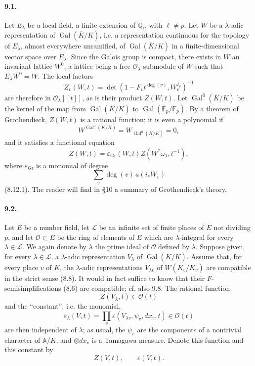 \documentclass[10pt,letterpaper]{article}
\newcommand{\Q}{\mathbb Q}
\newcommand{\F}{\mathbb F}
\newcommand{\Gal}{\operatorname{Gal}}
\providecommand{\Gal}{\operatorname{Gal}}
\providecommand{\LLL}{\mathcal L}
\providecommand{\Gal}{\operatorname{Gal}}
\providecommand{\Gal}{\operatorname{Gal}}
\providecommand{\Gal}{\operatorname{Gal}}
\begin{document}
\paragraph{9.1.} Let $E_\lambda$ be a local field, a finite extension of $\Q_\ell$, with $\ell\ne p$. Let $W$ be a $\lambda$-adic representation of $\Gal(\overline K/K)$, i.e. a representation continuous for the topology of $E_\lambda$, almost everywhere unramified, of $\Gal(\overline K/K)$ in a finite-dimensional vector space over $E_\lambda$. Since the Galois group is compact, there exists in $W$ an invariant lattice $W^0$, a lattice being a free $\mathcal O_\lambda$-submodule of $W$ such that $E_\lambda W^0=W$. The local factors
\[
Z_v(W,t)=\det(1-F_vt^{\deg(v)},W_v^{I_v})^{-1}
\]
are therefore in $\mathcal O_\lambda[[t]]$, as is their product $Z(W,t)$. Let $\Gal^0(\overline K/K)$ be the kernel of the map from $\Gal(\overline K/K)$ to $\Gal(\overline{\F}_p/\F_p)$. By a theorem of Grothendieck, $Z(W,t)$ is a rational function; it is even a polynomial if
\[
W^{\Gal^0(\overline K/K)}=W_{\Gal^0(\overline K/K)}=0,
\]
and it satisfies a functional equation
\[
\tag{9.1.1}
Z(W,t)=\varepsilon_{\mathrm{Gr}}(W,t)Z(W^*\omega_1,t^{-1}),
\]
where $\varepsilon_{\mathrm{Gr}}$ is a monomial of degree
\[
\sum_v\deg(v)\,a(i_*W_v)
\]
(8.12.1). The reader will find in §10 a summary of Grothendieck's theory.

\paragraph{9.2.} Let $E$ be a number field, let $\LLL$ be an infinite set of finite places of $E$ not dividing $p$, and let $\mathcal O\subset E$ be the ring of elements of $E$ which are $\lambda$-integral for every $\lambda\in\LLL$. We again denote by $\lambda$ the prime ideal of $\mathcal O$ defined by $\lambda$. Suppose given, for every $\lambda\in\LLL$, a $\lambda$-adic representation $V_\lambda$ of $\Gal(\overline K/K)$. Assume that, for every place $v$ of $K$, the $\lambda$-adic representations $V_{\lambda v}$ of $W(\overline K_v/K_v)$ are compatible in the strict sense (8.8). It would in fact suffice to know that their $F$-semisimplifications (8.6) are compatible; cf. also 9.8. The rational function
\[
Z(V_\lambda,t)\in\mathcal O(t)
\]
and the “constant”, i.e. the monomial,
\[
\varepsilon_\lambda(V,t)=\prod_v\varepsilon(V_{\lambda v},\psi_v,dx_v,t)\in\mathcal O(t)
\]
are then independent of $\lambda$; as usual, the $\psi_v$ are the components of a nontrivial character of $\mathbb A/K$, and $\otimes dx_v$ is a Tamagawa measure. Denote this function and this constant by
\[
Z(V,t),\qquad \varepsilon(V,t).
\]
\end{document}
